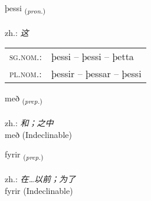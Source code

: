\documentclass[frontgrid, backgrid]{flacards}\usepackage[]{graphicx}\usepackage[]{xcolor}
\begin{document}
{þessi \small{\textsubscript{(\textit{pron.})}} \\[1ex] %
\textphonetic{[θɛsɪ]} \\
zh.: \emph{这} \\  [2ex]
\renewcommand*{\arraystretch}{0.8}
\begin{tabular}{ll}
\textsc{sg.nom.}: & þessi  --  þessi -- þetta \\ 
\textsc{pl.nom.}: & þessir -- þessar -- þessi
\end{tabular}
}


\renewcommand{\flhead}{\vskip5pt \fboxsep=0pt {\small\bfseries\footnotesize Forsetning | 介词}}
\renewcommand{\fcfoot}{\vskip5pt \fboxsep=0pt \hspace{2pt}{\small\bfseries\footnotesize 1K}}

\renewcommand{\blhead}{\vskip5pt {\small\bfseries\footnotesize Forsetning | 介词 }}
\renewcommand{\bcfoot}{\vskip5pt \hspace{2pt}{\small\bfseries\footnotesize 1K}}


{með \small{\textsubscript{(\textit{prep.})}} \\[1ex]
\textphonetic{[mɛːð]} \\
zh.: \emph{和；之中} \\  [2ex]
með (Indeclinable)}


\renewcommand{\flhead}{\vskip5pt \fboxsep=0pt {\small\bfseries\footnotesize Forsetning | 介词}}
\renewcommand{\fcfoot}{\vskip5pt \fboxsep=0pt \hspace{2pt}{\small\bfseries\footnotesize 1K}}

\renewcommand{\blhead}{\vskip5pt {\small\bfseries\footnotesize Forsetning | 介词 }}
\renewcommand{\bcfoot}{\vskip5pt \hspace{2pt}{\small\bfseries\footnotesize 1K}}


{fyrir \small{\textsubscript{(\textit{prep.})}} \\[1ex]
\textphonetic{[fɪːrɪr]} \\
zh.: \emph{在…以前；为了} \\  [2ex]
fyrir (Indeclinable)}
\end{document}
